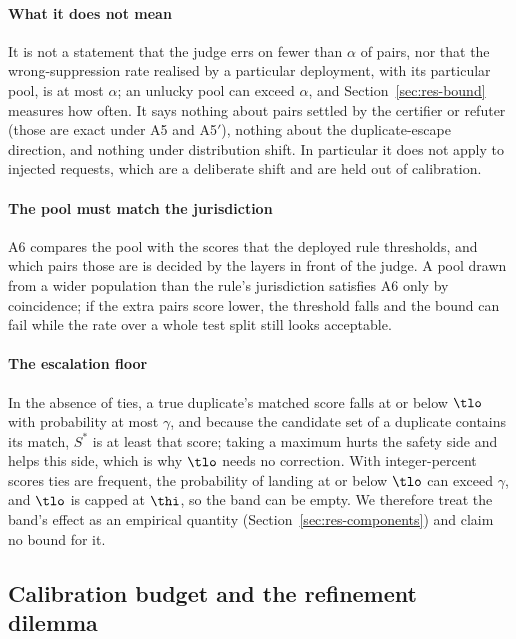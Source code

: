 \paragraph{What it does not mean}
It is not a statement that the judge errs on fewer than $\alpha$ of pairs, nor that the wrong-suppression rate realised by a particular deployment, with its particular pool, is at most $\alpha$; an unlucky pool can exceed $\alpha$, and Section~\ref{sec:res-bound} measures how often. It says nothing about pairs settled by the certifier or refuter (those are exact under A5 and A5$'$), nothing about the duplicate-escape direction, and nothing under distribution shift. In particular it does not apply to injected requests, which are a deliberate shift and are held out of calibration.

\paragraph{The pool must match the jurisdiction}
A6 compares the pool with the scores that the deployed rule thresholds, and which pairs those are is decided by the layers in front of the judge. A pool drawn from a wider population than the rule's jurisdiction satisfies A6 only by coincidence; if the extra pairs score lower, the threshold falls and the bound can fail while the rate over a whole test split still looks acceptable.

\paragraph{The escalation floor}
In the absence of ties, a true duplicate's matched score falls at or below $\tlo$ with probability at most $\gamma$, and because the candidate set of a duplicate contains its match, $S^\ast$ is at least that score; taking a maximum hurts the safety side and helps this side, which is why $\tlo$ needs no correction. With integer-percent scores ties are frequent, the probability of landing at or below $\tlo$ can exceed $\gamma$, and $\tlo$ is capped at $\thi$, so the band can be empty. We therefore treat the band's effect as an empirical quantity (Section~\ref{sec:res-components}) and claim no bound for it.

\subsection{Calibration budget and the refinement dilemma}\label{sec:dilemma}

